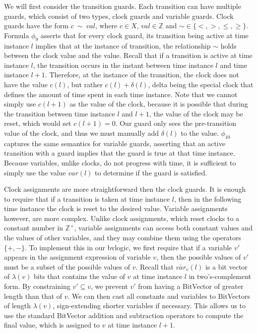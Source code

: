 \documentclass[a4paper,12pt]{article}
\begin{document}
We will first consider the transition guards. Each transition can have multiple
guards, which consist of two types, clock guards and variable guards. Clock
guards have the form \(c\ \sim\ val\), where \(c \in X\), \(val \in
\mathbb{Z}\) and \(\sim \in \{<,>,\leq,\geq\}\). Formula \(\phi_9\) asserts that
for every clock guard, its transition being active at time instance \(l\)
implies that at the instance of transition, the relationship \(\sim\) holds
between the clock value and the value. Recall that if a transition is active at
time instance \(l\), the transition occurs in the instant between time instance
\(l\) and time instance \(l+1\). Therefore, at the instance of the transition,
the clock does not have the value \(c(l)\), but rather \(c(l) + \delta(l)\),
delta being the special clock that defines the amount of time spent in each time
instance. Note that we cannot simply use \(c(l+1)\) as the value of the clock,
because it is possible that during the transition between time instance \(l\)
and \(l+1\), the value of the clock may be reset, which would set \(c(l+1)=0\).
Our guard only sees the pre-transition value of the clock, and thus we must
manually add \(\delta(l)\) to the value.
\(\phi_{10}\) captures the same semantics for variable guards, asserting that an
active transition with a guard implies that the guard is true at that time
instance. Because variables, unlike clocks, do not progress with time, it is
sufficient to simply use the value \(var(l)\) to determine if the guard is satisfied.

Clock assignments are more straightforward then the clock guards. It is enough
to require that if a transition is taken at time instance \(l\), then in the
following time instance the clock is reset to the desired value. Variable
assignments however, are more complex. Unlike clock assignments, which reset
clocks to a constant number in \(\mathbb{Z}^+\), variable assignments can access
both constant values and the values of other variables, and they may combine
them using the operators \(\{+,-\}\). To implement this in our bvlogic, we first
require that if a variable \(v'\) appears in the assignment expression of
variable \(v\), then the possible values of \(v'\) must be a subset of the
possible values of \(v\). Recall that \(\overleftarrow{var_v}(l)\) is a bit
vector of \(\lambda(v)\) bits that contains the value of \(v\) at time instance
\(l\) in two's-complement form. By constraining \(v' \subseteq v\), we prevent
\(v'\) from having a BitVector of greater length than that of \(v\). We can then
cast all constants and variables to BitVectors of length \(\lambda(v)\),
sign-extending shorter variables if necessary. This allows us to use the
standard BitVector addition and subtraction operators to compute the final
value, which is assigned to \(v\) at time instance \(l{+}1\).
\end{document}
